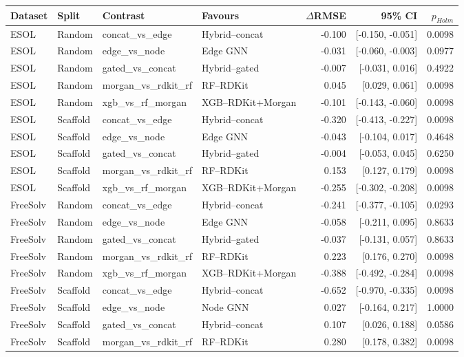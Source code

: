 \begin{tabular}{llllrrr}
\toprule
Dataset & Split & Contrast & Favours & $\Delta$RMSE & 95\% CI & $p_{Holm}$ \\
\midrule
ESOL & Random & concat\_vs\_edge & Hybrid--concat & -0.100 & [-0.150, -0.051] & 0.0098 \\
ESOL & Random & edge\_vs\_node & Edge GNN & -0.031 & [-0.060, -0.003] & 0.0977 \\
ESOL & Random & gated\_vs\_concat & Hybrid--gated & -0.007 & [-0.031, 0.016] & 0.4922 \\
ESOL & Random & morgan\_vs\_rdkit\_rf & RF--RDKit & 0.045 & [0.029, 0.061] & 0.0098 \\
ESOL & Random & xgb\_vs\_rf\_morgan & XGB--RDKit+Morgan & -0.101 & [-0.143, -0.060] & 0.0098 \\
ESOL & Scaffold & concat\_vs\_edge & Hybrid--concat & -0.320 & [-0.413, -0.227] & 0.0098 \\
ESOL & Scaffold & edge\_vs\_node & Edge GNN & -0.043 & [-0.104, 0.017] & 0.4648 \\
ESOL & Scaffold & gated\_vs\_concat & Hybrid--gated & -0.004 & [-0.053, 0.045] & 0.6250 \\
ESOL & Scaffold & morgan\_vs\_rdkit\_rf & RF--RDKit & 0.153 & [0.127, 0.179] & 0.0098 \\
ESOL & Scaffold & xgb\_vs\_rf\_morgan & XGB--RDKit+Morgan & -0.255 & [-0.302, -0.208] & 0.0098 \\
FreeSolv & Random & concat\_vs\_edge & Hybrid--concat & -0.241 & [-0.377, -0.105] & 0.0293 \\
FreeSolv & Random & edge\_vs\_node & Edge GNN & -0.058 & [-0.211, 0.095] & 0.8633 \\
FreeSolv & Random & gated\_vs\_concat & Hybrid--gated & -0.037 & [-0.131, 0.057] & 0.8633 \\
FreeSolv & Random & morgan\_vs\_rdkit\_rf & RF--RDKit & 0.223 & [0.176, 0.270] & 0.0098 \\
FreeSolv & Random & xgb\_vs\_rf\_morgan & XGB--RDKit+Morgan & -0.388 & [-0.492, -0.284] & 0.0098 \\
FreeSolv & Scaffold & concat\_vs\_edge & Hybrid--concat & -0.652 & [-0.970, -0.335] & 0.0098 \\
FreeSolv & Scaffold & edge\_vs\_node & Node GNN & 0.027 & [-0.164, 0.217] & 1.0000 \\
FreeSolv & Scaffold & gated\_vs\_concat & Hybrid--concat & 0.107 & [0.026, 0.188] & 0.0586 \\
FreeSolv & Scaffold & morgan\_vs\_rdkit\_rf & RF--RDKit & 0.280 & [0.178, 0.382] & 0.0098 \\

\end{tabular}

